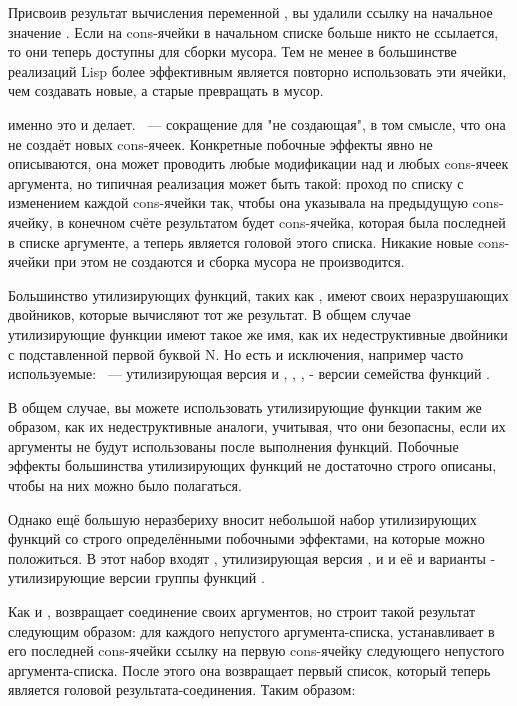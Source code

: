Присвоив результат вычисления переменной , вы удалили ссылку на начальное
значение . Если на cons-ячейки в начальном списке больше никто не ссылается,
то они теперь доступны для сборки мусора. Тем не менее в большинстве реализаций Lisp более
эффективным является повторно использовать эти ячейки, чем создавать новые, а старые
превращать в мусор.

 именно это и делает. ~--- сокращение для "не создающая", в том
смысле, что она не создаёт новых cons-ячеек. Конкретные побочные эффекты 
явно не описываются, она может проводить любые модификации над  и 
любых cons-ячеек аргумента, но типичная реализация может быть такой: проход по списку с
изменением  каждой cons-ячейки так, чтобы она указывала на предыдущую
cons-ячейку, в конечном счёте результатом будет cons-ячейка, которая была последней в
списке аргументе, а теперь является головой этого списка. Никакие новые cons-ячейки при
этом не создаются и сборка мусора не производится.

Большинство утилизирующих функций, таких как , имеют своих неразрушающих
двойников, которые вычисляют тот же результат. В общем случае утилизирующие функции имеют
такое же имя, как их недеструктивные двойники с подставленной первой буквой N. Но есть и
исключения, например часто используемые: ~--- утилизирующая версия
 и , , ,
 - версии семейства функций .

В общем случае, вы можете использовать утилизирующие функции таким же образом, как их
недеструктивные аналоги, учитывая, что они безопасны, если их аргументы не будут
использованы после выполнения функций. Побочные эффекты большинства утилизирующих функций
не достаточно строго описаны, чтобы на них можно было полагаться.

Однако ещё большую неразбериху вносит небольшой набор утилизирующих функций со строго
определёнными побочными эффектами, на которые можно положиться. В этот набор входят
, утилизирующая версия , и  и её  и
 варианты - утилизирующие версии группы функций .

Как и ,  возвращает соединение своих аргументов, но строит такой
результат следующим образом: для каждого непустого аргумента-списка, 
устанавливает в  его последней cons-ячейки ссылку на первую cons-ячейку
следующего непустого аргумента-списка. После этого она возвращает первый список, который
теперь является головой результата-соединения. Таким образом:

